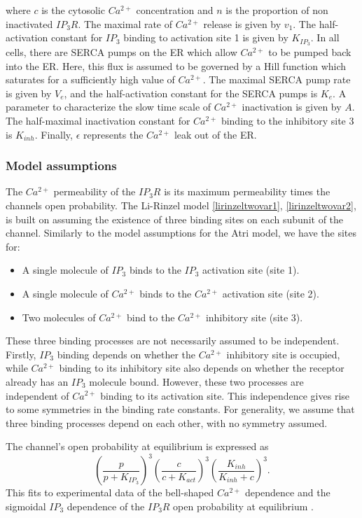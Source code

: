 where $c$ is the cytosolic $Ca^{2+}$ concentration and $n$ is the proportion of non inactivated $IP_3R$. The maximal rate of $Ca^{2+}$ release is given by $v_1$. The half-activation constant for $IP_3$ binding to activation site 1 is given by $K_{IP_3}$. {In all cells, there are SERCA pumps on the ER which allow $Ca^{2+}$ to be pumped back into the ER. Here, this flux is assumed to be governed by a Hill function which saturates for a sufficiently high value of $Ca^{2+}$.} The maximal SERCA pump rate is given by $V_e$, and the half-activation constant for the SERCA pumps is $K_e$. A parameter to characterize the slow time scale of $Ca^{2+}$ inactivation is given by $A$. The half-maximal inactivation constant for $Ca^{2+}$ binding to the inhibitory site 3 is $K_{inh}$. Finally, $\epsilon$ represents the $Ca^{2+}$ leak out of the ER.

\subsubsection*{Model assumptions}
The $Ca^{2+}$ permeability of the $IP_3R$ is its maximum permeability times the channels open probability. The Li-Rinzel model \eqref{lirinzeltwovar1}, \eqref{lirinzeltwovar2}, is built on assuming the existence of three binding sites on each subunit of the channel. Similarly to the model assumptions for the Atri model, we have the sites for:
\begin{itemize}
\item A single molecule of $IP_3$ binds to the $IP_3$ activation site (site 1).
\item A single molecule of $Ca^{2+}$ binds to the $Ca^{2+}$ activation site (site 2).
\item Two molecules of $Ca^{2+}$ bind to the $Ca^{2+}$ inhibitory site (site 3).
\end{itemize}

These three binding processes are not necessarily assumed to be independent. Firstly, $IP_3$ binding depends on whether the $Ca^{2+}$ inhibitory site is occupied, while $Ca^{2+}$ binding to its inhibitory site also depends on whether the receptor already has an $IP_3$ molecule bound. However, these two processes are independent of $Ca^{2+}$ binding to its activation site. This independence gives rise to some symmetries in the binding rate constants. For generality, we assume that three binding processes depend on each other, with no symmetry assumed.

The channel's open probability at equilibrium is expressed as
\begin{equation}
    \left(\frac{p}{p+K_{IP_3}}\right)^3\left(\frac{c}{c+K_{act}}\right)^3\left(\frac{K_{inh}}{K_{inh}+c}\right)^3.
\end{equation}
This fits to experimental data of the bell-shaped $Ca^{2+}$ dependence and the sigmoidal $IP_3$ dependence of the $IP_3R$ open probability at equilibrium .

